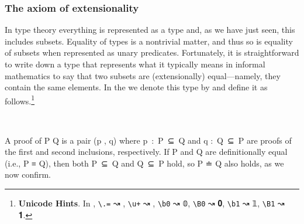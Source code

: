 \subsubsection{The axiom of extensionality}\label{sec:axiom-ext}
In type theory everything is represented as a type and, as we have just seen, this includes subsets.  Equality of types is a nontrivial matter, and thus so is equality of subsets when represented as unary predicates.  Fortunately, it is straightforward to write down a type that represents what it typically means in informal mathematics to say that two subsets are (extensionally) equal---namely, they contain the same elements. In the \ualib we denote this type by  and define it as follows.\footnote{\label{uhints}%
  \textbf{Unicode Hints}. In \agdamode, \texttt{\textbackslash{}.=} ↝ , \texttt{\textbackslash{}u+} ↝ , \texttt{\textbackslash{}b0} ↝ \af 𝟘, \texttt{\textbackslash{}B0} ↝ \af 𝟎, \texttt{\textbackslash{}b1} ↝ \af 𝟙, \texttt{\textbackslash{}B1} ↝ \af 𝟏.}
\ccpad
\begin{code}
\>[1]\AgdaSpace{}%
\AgdaSymbol{:}\AgdaSpace{}%
\AgdaSpace{}%
\AgdaSpace{}%
\AgdaSpace{}%
\AgdaSpace{}%
\AgdaSpace{}%
\AgdaSpace{}%
\AgdaSpace{}%
\AgdaSpace{}%
\AgdaSpace{}%
\AgdaSpace{}%
\AgdaSpace{}%
\AgdaSpace{}%
\AgdaSpace{}%
\<%
\\
%
\>[1]\AgdaSpace{}%
\AgdaSpace{}%
\AgdaSpace{}%
\AgdaSymbol{=}\AgdaSpace{}%
\AgdaSymbol{(}\AgdaSpace{}%
\AgdaSpace{}%
\AgdaSymbol{)}\AgdaSpace{}%
\AgdaSpace{}%
\AgdaSymbol{(}\AgdaSpace{}%
\AgdaSpace{}%
\AgdaSymbol{)}\<%
\end{code}
\ccpad
A proof of \ab P  Q is a pair (\ab p , \ab q) where \ab p~\as :~\ab P~\aof ⊆~\ab Q and \ab q :~\ab Q~\aof ⊆~\ab P are proofs of the first and second inclusions, respectively. If \ab P and \ab Q are definitionally equal (i.e., \ab P \aod ≡ \ab Q), then both \ab P~\aof ⊆~\ab Q and \ab Q~\aof ⊆~\ab P hold, so \ab P \aof ≐ \ab Q also holds, as we now confirm.
\ccpad
